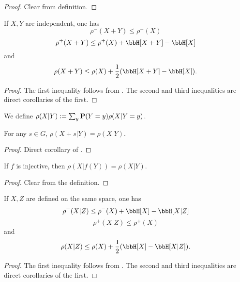 \begin{proof}  Clear from definition.
\end{proof}

\begin{lemma}\label{rho-sums}  If $X,Y$ are independent, one has
  $$ \rho^-(X+Y) \leq \rho^-(X)$$
  $$ \rho^+(X+Y) \leq \rho^+(X) + \bbH[X+Y] - \bbH[X]$$
and
  $$ \rho(X+Y) \leq \rho(X) + \frac{1}{2}( \bbH[X+Y] - \bbH[X] ).$$
\end{lemma}

\begin{proof}
The first inequality follows from . The second and third inequalities are direct corollaries of the first.
\end{proof}


\begin{definition}\label{rho-cond-def}  We define $\rho(X|Y) := \sum_y {\bf P}(Y=y) \rho(X|Y=y)$.
\end{definition}

\begin{lemma}\label{rho-cond-invariant}
  For any $s\in G$, $\rho(X+s|Y)=\rho(X|Y)$.
\end{lemma}
\begin{proof}
  Direct corollary of .
\end{proof}

\begin{lemma}\label{rho-cond-relabeled}
  If $f$ is injective, then $\rho(X|f(Y))=\rho(X|Y)$.
\end{lemma}
\begin{proof}
  Clear from the definition.
\end{proof}

\begin{lemma}\label{rho-cond}  If $X,Z$ are defined on the same space, one has
  $$ \rho^-(X|Z) \leq \rho^-(X) + \bbH[X] - \bbH[X|Z]$$
  $$ \rho^+(X|Z) \leq \rho^+(X)$$
and
  $$ \rho(X|Z) \leq \rho(X) + \frac{1}{2}( \bbH[X] - \bbH[X|Z] ).$$
\end{lemma}

\begin{proof}
  The first inequality follows from . The second and third inequalities are direct corollaries of the first.
\end{proof}

